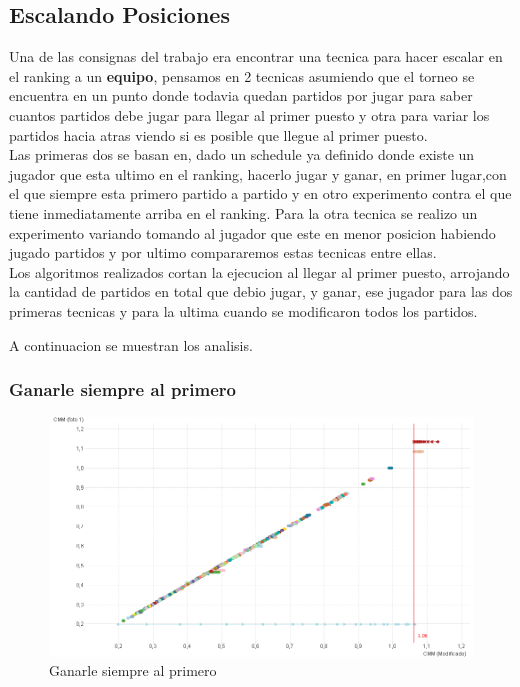 \subsection{Escalando Posiciones}

Una de las consignas del trabajo era encontrar una tecnica para hacer escalar en el ranking a un \textbf{equipo}, pensamos en 2 tecnicas asumiendo que el torneo se encuentra en un punto donde todavia quedan partidos por jugar para saber cuantos partidos debe jugar para llegar al primer puesto y otra para variar los partidos hacia atras viendo si es posible que llegue al primer puesto. 
\\
Las primeras dos se basan en, dado un schedule ya definido donde existe un jugador que esta ultimo en el ranking, hacerlo jugar y ganar, en primer lugar,con el que siempre esta primero partido a partido y en otro experimento contra el que tiene inmediatamente arriba en el ranking. Para la otra tecnica se realizo un experimento variando tomando al jugador que este en menor posicion habiendo jugado partidos y por ultimo compararemos estas tecnicas entre ellas.
\\
Los algoritmos realizados cortan la ejecucion al llegar al primer puesto, arrojando la cantidad de partidos en total que debio jugar, y ganar, ese jugador para las dos primeras tecnicas y para la ultima cuando se modificaron todos los partidos.

A continuacion se muestran los analisis.

\subsubsection{Ganarle siempre al primero}

\begin{figure}[H]
\centering
\includegraphics[width=1\textwidth]{IMG/estrategia 5.png}
\caption{Ganarle siempre al primero}
\label{fig:Ganarle siempre al primero}
\end{figure}

